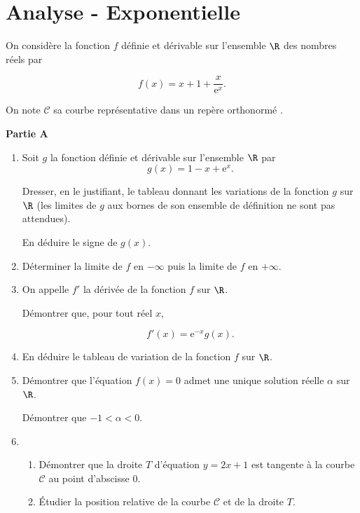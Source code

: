 \documentclass{cornouaille}
\begin{document}
\section{Analyse - Exponentielle}
\begin{exercice}


On considère la fonction $f$ définie et dérivable sur l'ensemble $\R$ des nombres réels par 

\[f(x) = x + 1 + \dfrac{x}{\text{e}^x}.\]

On note $\mathcal{C}$ sa courbe représentative dans un repère orthonormé \Oij. 

\medskip

\textbf{Partie A}

\medskip

\begin{enumerate}
\item Soit $g$ la fonction définie et dérivable sur l'ensemble $\R$ par 
\[g(x) = 1 - x + \text{e}^x.\]
 
Dresser, en le justifiant, le tableau donnant les variations de la fonction $g$ sur $\R$ (les limites de $g$ aux bornes de son ensemble de définition ne sont pas attendues).
 
En déduire le signe de $g(x)$. 
\item Déterminer la limite de $f$ en $- \infty$ puis la limite de $f$ en $+ \infty$. 
\item On appelle $f'$ la dérivée de la fonction $f$ sur $\R$. 

Démontrer que, pour tout réel $x$, 

\[f'(x) = \text{e}^{- x}g(x).\]
 
\item En déduire le tableau de variation de la fonction $f$ sur $\R$. 
\item Démontrer que l'équation $f(x) = 0$ admet une unique solution réelle $\alpha$ sur $\R$.
 
Démontrer que $- 1 < \alpha < 0$.  
\item 
	\begin{enumerate}
		\item Démontrer que la droite $T$ d'équation $y = 2x + 1$ est tangente à la courbe $\mathcal{C}$  au point d'abscisse $0$.
		\item Étudier la position relative de la courbe $\mathcal{C}$ et de la droite $T$.
	\end{enumerate} 
\end{enumerate}


\end{exercice}
\end{document}
